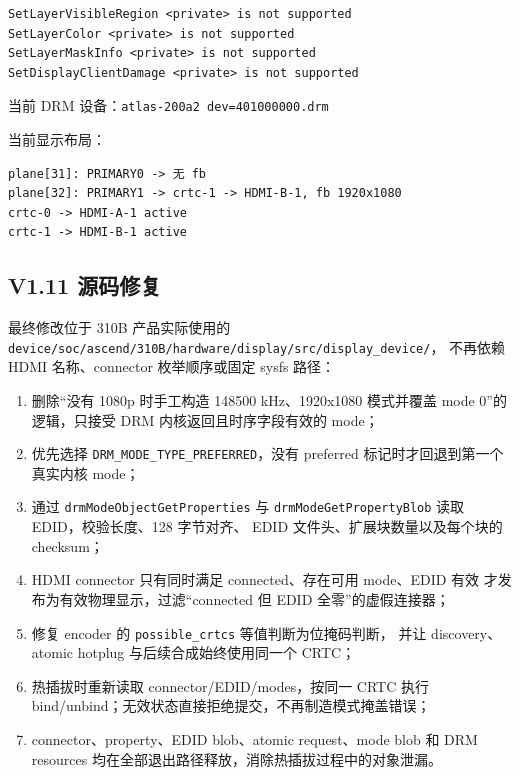 \begin{lstlisting}[style=shell]
SetLayerVisibleRegion <private> is not supported
SetLayerColor <private> is not supported
SetLayerMaskInfo <private> is not supported
SetDisplayClientDamage <private> is not supported
\end{lstlisting}

当前 DRM 设备：\texttt{atlas-200a2 dev=401000000.drm}

当前显示布局：

\begin{lstlisting}[style=shell]
plane[31]: PRIMARY0 -> 无 fb
plane[32]: PRIMARY1 -> crtc-1 -> HDMI-B-1, fb 1920x1080
crtc-0 -> HDMI-A-1 active
crtc-1 -> HDMI-B-1 active
\end{lstlisting}

\subsection{V1.11 源码修复}

最终修改位于 310B 产品实际使用的
\texttt{device/soc/ascend/310B/hardware/display/src/display\_device/}，
不再依赖 HDMI 名称、connector 枚举顺序或固定 sysfs 路径：

\begin{enumerate}
  \item 删除“没有 1080p 时手工构造 148500 kHz、1920x1080 模式并覆盖
  mode 0”的逻辑，只接受 DRM 内核返回且时序字段有效的 mode；
  \item 优先选择 \texttt{DRM\_MODE\_TYPE\_PREFERRED}，没有 preferred
  标记时才回退到第一个真实内核 mode；
  \item 通过 \texttt{drmModeObjectGetProperties} 与
  \texttt{drmModeGetPropertyBlob} 读取 EDID，校验长度、128 字节对齐、
  EDID 文件头、扩展块数量以及每个块的 checksum；
  \item HDMI connector 只有同时满足 connected、存在可用 mode、EDID 有效
  才发布为有效物理显示，过滤“connected 但 EDID 全零”的虚假连接器；
  \item 修复 encoder 的 \texttt{possible\_crtcs} 等值判断为位掩码判断，
  并让 discovery、atomic hotplug 与后续合成始终使用同一个 CRTC；
  \item 热插拔时重新读取 connector/EDID/modes，按同一 CRTC 执行
  bind/unbind；无效状态直接拒绝提交，不再制造模式掩盖错误；
  \item connector、property、EDID blob、atomic request、mode blob 和 DRM
  resources 均在全部退出路径释放，消除热插拔过程中的对象泄漏。
\end{enumerate}

